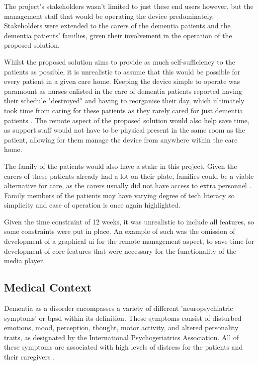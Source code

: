 The project's stakeholders wasn't limited to just these end users however, but the management staff that would be operating the device predominately. Stakeholders were extended to the carers of the dementia patients and the dementia patients' families, given their involvement in the operation of the proposed solution. 

Whilst the proposed solution aims to provide as much self-sufficiency to the patients as possible, it is unrealistic to assume that this would be possible for every patient in a given care home. Keeping the device simple to operate was paramount as nurses enlisted in the care of dementia patients reported having their schedule "destroyed" and having to reorganise their day, which ultimately took time from caring for these patients as they rarely cared for just dementia patients \citep{krupic2020experience}. The remote aspect of the proposed solution would also help save time, as support staff would not have to be physical present in the same room as the patient, allowing for them manage the device from anywhere within the care home.

The family of the patients would also have a stake in this project. Given the carers of these patients already had a lot on their plate, families could be a viable alternative for care, as the carers usually did not have access to extra personnel \citep{krupic2020experience}. Family members of the patients may have varying degree of tech literacy so simplicity and ease of operation is once again highlighted.

Given the time constraint of 12 weeks, it was unrealistic to include all features, so some constraints were put in place. An example of such was the omission of development of a graphical \gls{ui} for the remote management aspect, to save time for development of core features that were necessary for the functionality of the media player.

\subsection{Medical Context}\label{subsec:medContext}
Dementia as a disorder encompasses a variety of different 'neuropsychiatric symptoms' or \gls{bpsd} within its definition. These symptoms consist of disturbed emotions, mood, perception, thought, motor activity, and altered personality traits, as designated by the International Psychogeriatrics Association. All of these symptoms are associated with high levels of distress for the patients and their caregivers \citep{10.3389/fneur.2012.00073}.

